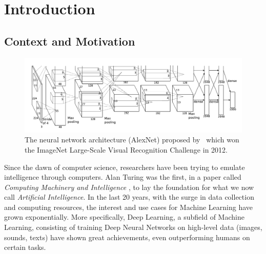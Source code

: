 \chapter{Introduction}
\label{chapter:ch1-introduction}
\localtoc

\section{Context and Motivation}
\label{section:ch1-context_and_motivation}

\begin{figure}[t]
  \centering
  \includegraphics[scale=0.2]{figures/main/ch1-introduction/alexnet.png}
  \caption{The neural network architecture (AlexNet) proposed by~\citet{krizhevsky2012imagenet} which won the ImageNet Large-Scale Visual Recognition Challenge in 2012.}
  \label{figure:ch1-alexnet_network}
\end{figure}

Since the dawn of computer science, researchers have been trying to emulate intelligence through computers.
Alan Turing was the first, in a paper called \emph{Computing Machinery and Intelligence} \cite{turing1950computing}, to lay the foundation for what we now call \emph{Artificial Intelligence}.
In the last 20 years, with the surge in data collection and computing resources, the interest and use cases for Machine Learning have grown exponentially.
More specifically, Deep Learning, a subfield of Machine Learning, consisting of training Deep Neural Networks on high-level data (images, sounds, texts) have shown great achievements, even outperforming humans on certain tasks.



